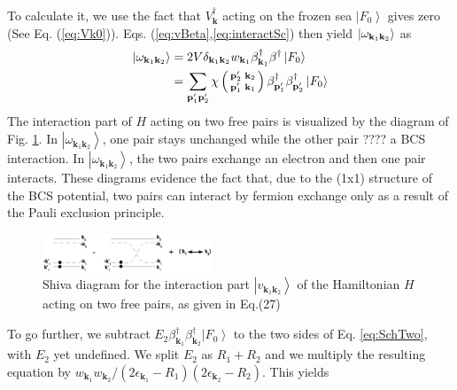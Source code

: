 \documentclass[aps,prb,superscriptaddress,showpacs,reprint,lengthcheck]{revtex4-1}
\newcommand{\vk}{\ensuremath{\mathbf{k}}}
\newcommand{\vp}{\ensuremath{\mathbf{p}}}
\begin{document}
To calculate it, we use the fact that $V^{\dagger}_{\mathbf{k}}$ acting on the frozen sea $\left|F_0\right>$ gives zero (See Eq. (\ref{eq:Vk0})).  Eqs. (\ref{eq:vBeta},\ref{eq:interactSc}) then yield  $\left|\omega_{%
\mathbf{k} _1\mathbf{k} _2}\right> $ as 
\begin{equation}\label{eq:omega2}
\begin{split}
\left|\omega_{\mathbf{k} _1\mathbf{k} _2}\right>&=2V\delta_{\mathbf{k} _1\mathbf{k} _2}w_{\mathbf{k} _1}\beta^{\dagger}_{
\mathbf{k} _1} \beta^{\dagger}\left|F_0\right>\\
&=\sum_{\mathbf{p} ^{\prime}_1\mathbf{p}
^{\prime}_2}\chi\left(\begin{smallmatrix}\vp'_2&\vk_2\\\vp'_1&\vk_1%
\end{smallmatrix}\right)  \beta^{\dagger}_{\mathbf{p} ^{\prime}_1}\beta^{%
\dagger}_{\mathbf{p} ^{\prime}_2}\left|F_0\right>  
\end{split}
\end{equation}
The interaction part of $H$ acting on two free pairs is  visualized by
the diagram of Fig. \ref{fig:twoP}. In $\left|\omega_{\mathbf{k} _1\mathbf{k} _2}\right>$, one pair stays unchanged while the other pair ???? a BCS interaction. In $\left|\omega_{\mathbf{k} _1\mathbf{k} _2}\right>$, the two pairs exchange an electron and then one pair interacts.   These diagrams evidence the fact that,
due to the (1x1) structure of the BCS potential,  two pairs 
can  interact by fermion exchange only as a result of the
Pauli exclusion principle.

\begin{figure}[htb]
   \includegraphics[width=0.45\textwidth]{twoPair.eps}
\caption{Shiva diagram for the interaction part $\left|v_{\mathbf{k} _1\mathbf{k} _2}\right>$ of the Hamiltonian $H$ acting on two free pairs, as given in Eq.(27)}
\label{fig:twoP}
\end{figure}


To go further, we subtract $E _2\beta^{\dagger}_{\mathbf{k}
_1}\beta^{\dagger}_{\mathbf{k} _2}\left|F_0\right>  $ to the two sides of Eq.%
\eqref{eq:SchTwo}, with $E _2$ yet undefined. We split $E _2$ as $R_1+R_2$ and we multiply
the resulting equation by $w_{\mathbf{k} _1}w_{\mathbf{k} _2}/\left(2%
\epsilon_{\mathbf{k} _1}-R_1\right) \left(2\epsilon_{\mathbf{k}
_2}-R_2\right) $. This yields
\end{document}

